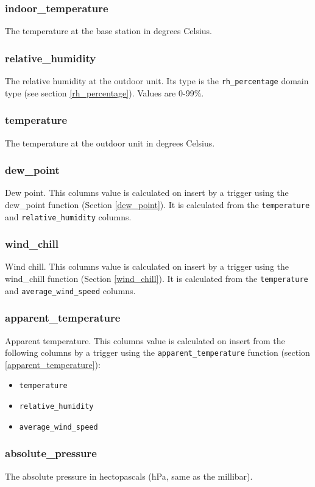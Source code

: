 \documentclass[a4paper,10pt]{book}
\begin{document}
\subsubsection{indoor\_temperature}
The temperature at the base station in degrees Celsius. 

\subsubsection{relative\_humidity}
The relative humidity at the outdoor unit. Its type is the \verb|rh_percentage| domain type (see section \ref{rh_percentage}). Values are 0-99\%.

\subsubsection{temperature}
The temperature at the outdoor unit in degrees Celsius.

\subsubsection{dew\_point}
Dew point. This columns value is calculated on insert by a trigger using the dew\_point function (Section \ref{dew_point}). It is calculated from the \verb|temperature| and \verb|relative_humidity| columns.

\subsubsection{wind\_chill}
Wind chill. This columns value is calculated on insert by a trigger using the wind\_chill function (Section \ref{wind_chill}). It is calculated from the \verb|temperature| and \verb|average_wind_speed| columns.

\subsubsection{apparent\_temperature}
Apparent temperature. This columns value is calculated on insert from the following columns by a trigger using the \verb|apparent_temperature| function (section \ref{apparent_temperature}):
\begin{itemize}
\item \verb|temperature|
\item \verb|relative_humidity|
\item \verb|average_wind_speed|
\end{itemize}

\subsubsection{absolute\_pressure}
The absolute pressure in hectopascals (hPa, same as the millibar).
\end{document}
